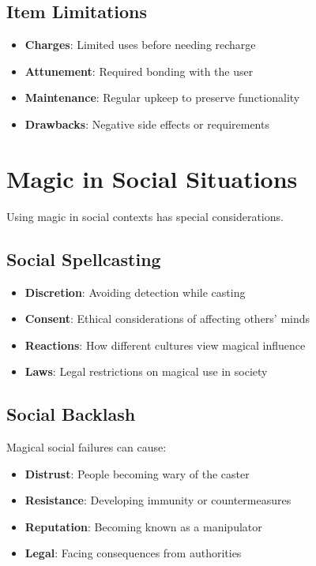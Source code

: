\begin{multicols}{2}
\subsection*{Item Limitations}
\begin{itemize}
\item \textbf{Charges}: Limited uses before needing recharge
\item \textbf{Attunement}: Required bonding with the user
\item \textbf{Maintenance}: Regular upkeep to preserve functionality
\item \textbf{Drawbacks}: Negative side effects or requirements
\end{itemize}

\section{Magic in Social Situations} 

Using magic in social contexts has special considerations.

\subsection*{Social Spellcasting}
\begin{itemize}
\item \textbf{Discretion}: Avoiding detection while casting
\item \textbf{Consent}: Ethical considerations of affecting others' minds
\item \textbf{Reactions}: How different cultures view magical influence
\item \textbf{Laws}: Legal restrictions on magical use in society
\end{itemize}

\subsection*{Social Backlash}
Magical social failures can cause:
\begin{itemize}
\item \textbf{Distrust}: People becoming wary of the caster
\item \textbf{Resistance}: Developing immunity or countermeasures
\item \textbf{Reputation}: Becoming known as a manipulator
\item \textbf{Legal}: Facing consequences from authorities
\end{itemize}


\end{multicols}
